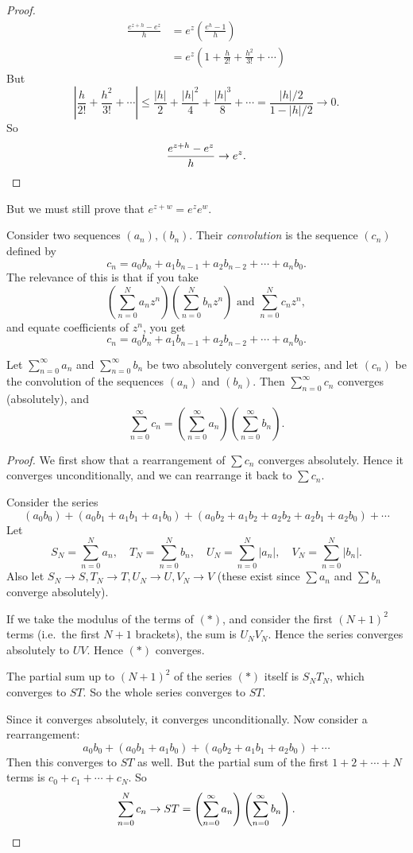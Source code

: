 \documentclass[a4paper]{article}
\begin{document}
\begin{proof}
  \begin{align*}
    \frac{e^{z + h} - e^z}{h} &= e^z \left(\frac{e^h - 1}{h}\right)\\
    &= e^z\left(1 + \frac{h}{2!} + \frac{h^2}{3!} + \cdots\right)
  \end{align*}
  But
  \[
    \left|\frac{h}{2!} + \frac{h^2}{3!} + \cdots \right| \leq \frac{|h|}{2} + \frac{|h|^2}{4} + \frac{|h|^3}{8} + \cdots = \frac{|h|/2}{1 - |h|/2} \to 0.
  \]
  So
  \[
    \frac{e^{z + h} - e^z}{h} \to e^z.\qedhere
  \]
\end{proof}

But we must still prove that $e^{z + w} = e^ze^w$.

Consider two sequences $(a_n), (b_n)$. Their \emph{convolution} is the sequence $(c_n)$ defined by
\[
  c_n = a_0b_n + a_1b_{n - 1} + a_2b_{n - 2} + \cdots + a_nb_0.
\]
The relevance of this is that if you take
\[
  \left(\sum_{n = 0}^N a_nz^n\right)\left(\sum_{n = 0}^N b_nz^n\right)\text{ and }\sum_{n = 0}^N c_n z^n,
\]
and equate coefficients of $z^n$, you get
\[
  c_n = a_0b_n + a_1b_{n - 1} + a_2b_{n - 2} + \cdots + a_nb_0.
\]
\begin{thm}
  Let $\sum_{n = 0}^\infty a_n$ and $\sum_{n = 0}^\infty b_n$ be two absolutely convergent series, and let $(c_n)$ be the convolution of the sequences $(a_n)$ and $(b_n)$. Then $\sum_{n = 0}^\infty c_n$ converges (absolutely), and
  \[
    \sum_{n = 0}^{\infty} c_n = \left(\sum_{n = 0}^\infty a_n\right)\left(\sum_{n = 0}^\infty b_n \right).
  \]
\end{thm}

\begin{proof}
  We first show that a rearrangement of $\sum c_n$ converges absolutely. Hence it converges unconditionally, and we can rearrange it back to $\sum c_n$.

  Consider the series
  \[
    (a_0b_0) + (a_0 b_1 + a_1b_1 + a_1b_0) + (a_0 b_2 + a_1 b_2 + a_2b_2 + a_2b_1 + a_2b_0) + \cdots\tag{$*$}
  \]
  Let
  \[
    S_N = \sum_{n = 0}^{N}a_n, \quad T_N = \sum_{n = 0}^N b_n,\quad U_N = \sum_{n = 0}^N | a_n|,\quad V_N = \sum_{n = 0}^N|b_n|.
  \]
  Also let $S_N \to S, T_N \to T, U_N \to U, V_N \to V$ (these exist since $\sum a_n$ and $\sum b_n$ converge absolutely).

  If we take the modulus of the terms of $(*)$, and consider the first $(N + 1)^2$ terms (i.e.\ the first $N + 1$ brackets), the sum is $U_NV_N$. Hence the series converges absolutely to $UV$. Hence $(*)$ converges.

  The partial sum up to $(N + 1)^2$ of the series $(*)$ itself is $S_NT_N$, which converges to $ST$. So the whole series converges to $ST$.

  Since it converges absolutely, it converges unconditionally. Now consider a rearrangement:
  \[
    a_0 b_0 + (a_0b_1 + a_1b_0) + (a_0b_2 + a_1b_1 + a_2b_0) + \cdots
  \]
  Then this converges to $ST$ as well. But the partial sum of the first $1 + 2 + \cdots + N$ terms is $c_0 + c_1 + \cdots + c_N$. So
  \[
    \sum_{n = 0}^N c_n \to ST = \left(\sum_{n = 0}^\infty a_n\right)\left(\sum_{n = 0}^\infty b_n \right). \qedhere
  \]
\end{proof}
\end{document}

